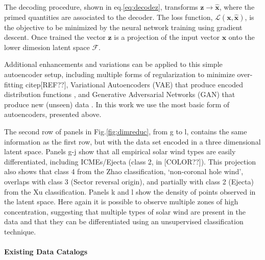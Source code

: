 The decoding procedure, shown in eq.\eqref{eq:decodez}, transforms $\boldsymbol{z}\rightarrow\boldsymbol{\hat{x}}$, where the primed quantities are associated to the decoder. The loss function, $\mathcal{L}(\boldsymbol{x}, \boldsymbol{\hat{x}})$, is the objective to be minimized by the neural network training using gradient descent. Once trained the vector $\boldsymbol{z}$ is a projection of the input vector $\boldsymbol{x}$ onto the lower dimesion latent space $\boldsymbol{\mathcal{F}}$.

Additional enhancements and variations can be applied to this simple autoencoder setup, including multiple forms of regularization to minimize over-fitting citep{[REF??]}, Variational Autoencoders (VAE) that produce encoded distribution functions \citep{[REF??]}, and Generative Adversarial Networks (GAN) that produce new (unseen) data \citep{[REF??]}. In this work we use the most basic form of autoencoders, presented above.

The second row of panels in Fig.\ref{fig:dimreduc}, from g to l, contains the same information as the first row, but with the data set encoded in a three dimensional latent space. Panels g-j show that all empirical solar wind types are easily differentiated, including ICMEs/Ejecta (class 2, in [COLOR??]). This projection also shows that class 4 from the Zhao classification, `non-coronal hole wind', overlaps with class 3 (Sector reversal origin), and partially with class 2 (Ejecta) from the Xu classification. Panels k and l show the density of points observed in the latent space. Here again it is possible to observe multiple zones of high concentration, suggesting that multiple types of solar wind are present in the data and that they can be differentiated using an unsupervised classification technique.

\paragraph{Existing Data Catalogs}